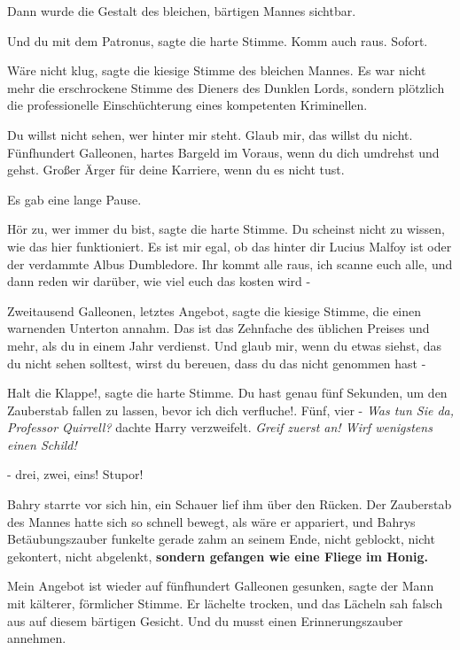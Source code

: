 Dann wurde die Gestalt des bleichen, bärtigen Mannes sichtbar.

\glqq{}Und du mit dem Patronus\grqq{}, sagte die harte Stimme. \glqq{}Komm auch
raus. Sofort.\grqq{}

\glqq{}Wäre nicht klug\grqq{}, sagte die kiesige Stimme des bleichen Mannes. Es
war nicht mehr die erschrockene Stimme des Dieners des Dunklen Lords, sondern
plötzlich die professionelle Einschüchterung eines kompetenten Kriminellen.

\glqq{}Du willst nicht sehen, wer hinter mir steht. Glaub mir, das willst du
nicht. Fünfhundert Galleonen, hartes Bargeld im Voraus, wenn du dich umdrehst
und gehst. Großer Ärger für deine Karriere, wenn du es nicht tust.\grqq{}

Es gab eine lange Pause.

\glqq{}Hör zu, wer immer du bist\grqq{}, sagte die harte Stimme. \glqq{}Du
scheinst nicht zu wissen, wie das hier funktioniert. Es ist mir egal, ob das
hinter dir Lucius Malfoy ist oder der verdammte Albus Dumbledore. Ihr kommt alle
raus, ich scanne euch alle, und dann reden wir darüber, wie viel euch das kosten
wird -\grqq{}

\glqq{}Zweitausend Galleonen, letztes Angebot\grqq{}, sagte die kiesige Stimme,
die einen warnenden Unterton annahm. \glqq{}Das ist das Zehnfache des üblichen
Preises und mehr, als du in einem Jahr verdienst. Und glaub mir, wenn du etwas
siehst, das du nicht sehen solltest, wirst du bereuen, dass du das nicht
genommen hast -\grqq{}

\glqq{}Halt die Klappe!\grqq{}, sagte die harte Stimme. \glqq{}Du hast genau fünf
Sekunden, um den Zauberstab fallen zu lassen, bevor ich dich verfluche!. Fünf,
vier -\grqq{} \emph{ Was tun Sie da, Professor Quirrell?} dachte Harry verzweifelt.
\emph{Greif zuerst an! Wirf wenigstens einen Schild!}

\glqq{}- drei, zwei, eins! Stupor!\grqq{}

Bahry starrte vor sich hin, ein Schauer lief ihm über den Rücken. Der Zauberstab
des Mannes hatte sich so schnell bewegt, als wäre er appariert, und Bahrys
Betäubungszauber funkelte gerade zahm an seinem Ende, nicht geblockt, nicht
gekontert, nicht abgelenkt, \textbf{sondern gefangen wie eine Fliege im Honig.}

\glqq{}Mein Angebot ist wieder auf fünfhundert Galleonen gesunken\grqq{}, sagte
der Mann mit kälterer, förmlicher Stimme. Er lächelte trocken, und das Lächeln
sah falsch aus auf diesem bärtigen Gesicht. \glqq{}Und du musst einen
Erinnerungszauber annehmen.\grqq{}

